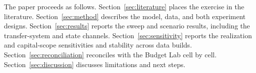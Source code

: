 The paper proceeds as follows. Section~\ref{sec:literature} places the
exercise in the literature. Section~\ref{sec:method} describes the model,
data, and both experiment designs. Section~\ref{sec:results} reports the
sweep and scenario results, including the transfer-system and state channels.
Section~\ref{sec:sensitivity} reports the realization and capital-scope
sensitivities and stability across data builds.
Section~\ref{sec:reconciliation} reconciles with the Budget Lab cell by cell.
Section~\ref{sec:discussion} discusses limitations and next steps.
